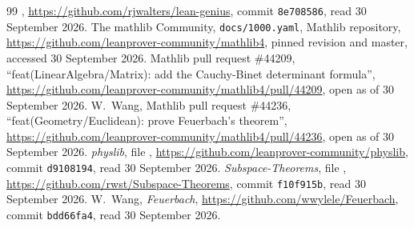 \documentclass[11pt]{article}
\theoremstyle{definition}
\theoremstyle{remark}
\begin{document}
\begin{thebibliography}{99}
, \url{https://github.com/rjwalters/lean-genius}, commit \texttt{8e708586}, read 30 September 2026.
 The mathlib Community, \texttt{docs/1000.yaml}, Mathlib repository,
\url{https://github.com/leanprover-community/mathlib4}, pinned revision and master, accessed
30 September 2026.
 Mathlib pull request \#44209, ``feat(LinearAlgebra/Matrix): add the Cauchy-Binet
determinant formula'', \url{https://github.com/leanprover-community/mathlib4/pull/44209}, open as of
30 September 2026.
 W.~Wang, Mathlib pull request \#44236, ``feat(Geometry/Euclidean): prove
Feuerbach's theorem'', \url{https://github.com/leanprover-community/mathlib4/pull/44236}, open as of
30 September 2026.
 \emph{physlib}, file ,
\url{https://github.com/leanprover-community/physlib}, commit \texttt{d9108194}, read 30 September 2026.
 \emph{Subspace-Theorems}, file ,
\url{https://github.com/rwst/Subspace-Theorems}, commit \texttt{f10f915b}, read 30 September 2026.
 W.~Wang, \emph{Feuerbach}, \url{https://github.com/wwylele/Feuerbach},
commit \texttt{bdd66fa4}, read 30 September 2026.
\end{thebibliography}
\end{document}
